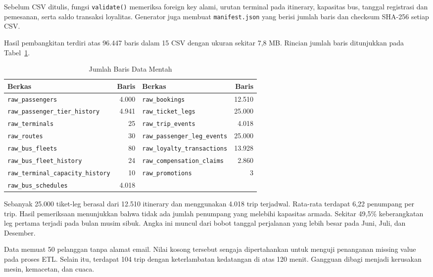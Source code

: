 Sebelum CSV ditulis, fungsi \texttt{validate()} memeriksa foreign key alami,
urutan terminal pada itinerary, kapasitas bus, tanggal registrasi dan pemesanan,
serta saldo transaksi loyalitas. Generator juga membuat \texttt{manifest.json}
yang berisi jumlah baris dan checksum SHA-256 setiap CSV.

Hasil pembangkitan terdiri atas 96.447 baris dalam 15 CSV dengan ukuran sekitar
7,8 MB. Rincian jumlah baris ditunjukkan pada Tabel~\ref{tab:volume-raw-data}.

\begin{table}[htbp]
\centering
\small
\caption{Jumlah Baris Data Mentah}
\label{tab:volume-raw-data}
\begin{tabular}{|l|r|l|r|}
\hline
\textbf{Berkas} & \textbf{Baris} & \textbf{Berkas} & \textbf{Baris} \\
\hline
\texttt{raw\_passengers} & 4.000 & \texttt{raw\_bookings} & 12.510 \\
\texttt{raw\_passenger\_tier\_history} & 4.941 & \texttt{raw\_ticket\_legs} & 25.000 \\
\texttt{raw\_terminals} & 25 & \texttt{raw\_trip\_events} & 4.018 \\
\texttt{raw\_routes} & 30 & \texttt{raw\_passenger\_leg\_events} & 25.000 \\
\texttt{raw\_bus\_fleets} & 80 & \texttt{raw\_loyalty\_transactions} & 13.928 \\
\texttt{raw\_bus\_fleet\_history} & 24 & \texttt{raw\_compensation\_claims} & 2.860 \\
\texttt{raw\_terminal\_capacity\_history} & 10 & \texttt{raw\_promotions} & 3 \\
\texttt{raw\_bus\_schedules} & 4.018 & & \\
\hline
\end{tabular}
\end{table}

Sebanyak 25.000 tiket-leg berasal dari 12.510 itinerary dan menggunakan 4.018
trip terjadwal. Rata-rata terdapat 6,22 penumpang per trip. Hasil pemeriksaan
menunjukkan bahwa tidak ada jumlah penumpang yang melebihi kapasitas armada.
Sekitar 49,5\% keberangkatan leg pertama terjadi pada bulan musim sibuk. Angka
ini muncul dari bobot tanggal perjalanan yang lebih besar pada Juni, Juli, dan
Desember.

Data memuat 50 pelanggan tanpa alamat email. Nilai kosong tersebut sengaja
dipertahankan untuk menguji penanganan missing value pada proses ETL. Selain itu,
terdapat 104 trip dengan keterlambatan kedatangan di atas 120 menit. Gangguan
dibagi menjadi kerusakan mesin, kemacetan, dan cuaca.

